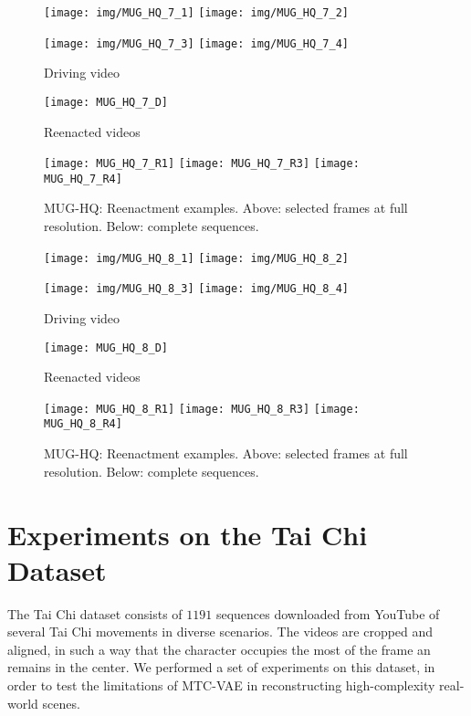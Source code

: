 \begin{figure*}
\texttt{[image: img/MUG\_HQ\_7\_1]}
\texttt{[image: img/MUG\_HQ\_7\_2]}

\vspace{.8mm}
\texttt{[image: img/MUG\_HQ\_7\_3]}
\texttt{[image: img/MUG\_HQ\_7\_4]}

\centering
Driving video

\texttt{[image: MUG\_HQ\_7\_D]}

Reenacted videos

\texttt{[image: MUG\_HQ\_7\_R1]}
\texttt{[image: MUG\_HQ\_7\_R3]}
\texttt{[image: MUG\_HQ\_7\_R4]}

\caption{MUG-HQ: Reenactment examples. Above: selected frames at full resolution. Below: complete sequences.}
\label{fig:hq7}
\end{figure*}

\begin{figure*}
\texttt{[image: img/MUG\_HQ\_8\_1]}
\texttt{[image: img/MUG\_HQ\_8\_2]}

\vspace{.8mm}
\texttt{[image: img/MUG\_HQ\_8\_3]}
\texttt{[image: img/MUG\_HQ\_8\_4]}

\centering
Driving video

\texttt{[image: MUG\_HQ\_8\_D]}

Reenacted videos

\texttt{[image: MUG\_HQ\_8\_R1]}
\texttt{[image: MUG\_HQ\_8\_R3]}
\texttt{[image: MUG\_HQ\_8\_R4]}


\caption{MUG-HQ: Reenactment examples. Above: selected frames at full resolution. Below: complete sequences.}
\label{fig:hq8}
\end{figure*}

\section{Experiments on the Tai Chi Dataset}
\label{sec:taichi}

The Tai Chi dataset consists of $1191$ sequences downloaded from YouTube of several Tai Chi movements in diverse scenarios.
The videos are cropped and aligned, in such a way that the character occupies the most of the frame an remains in the center.
We performed a set of experiments on this dataset, in order to test the limitations of MTC-VAE in reconstructing high-complexity real-world scenes.


